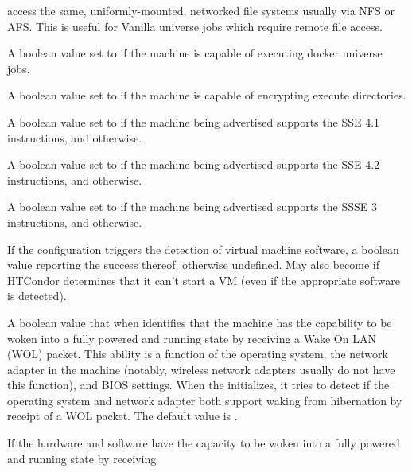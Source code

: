 \begin{description}
access the same, uniformly-mounted, networked file systems usually via
NFS or AFS.  This is useful for Vanilla universe jobs which require
remote file access.
%
\item[\AdAttr{HasDocker}:] A boolean value 
set to  if the machine is capable of executing docker
universe jobs.
%
\item[\AdAttr{HasEncryptExecuteDirectory}:] A boolean value 
set to  if the machine is capable of encrypting execute directories.
%
\item[\AdAttr{Has\_sse4\_1}:] A boolean value set to 
 if the machine being advertised supports
the SSE 4.1 instructions, and  otherwise.
%
\item[\AdAttr{Has\_sse4\_2}:] A boolean value set to 
if the machine being advertised supports
the SSE 4.2 instructions, and  otherwise.
%
\item[\AdAttr{has\_ssse3}:] A boolean value set to 
if the machine being advertised supports
the SSSE 3 instructions, and  otherwise.
%
\item[\AdAttr{HasVM}:] If the configuration triggers the detection of
virtual machine software, a boolean value reporting the success thereof;
otherwise undefined.  May also become  if HTCondor determines
that it can't start a VM (even if the appropriate software is detected).
%
\item[\AdAttr{IsWakeAble}:] A boolean value that when  identifies
that the machine has the capability to be woken into a 
fully powered and running state by receiving a Wake On LAN (WOL) packet.
This ability is a function of the operating system, 
the network adapter in the machine 
(notably, wireless network adapters usually do not have this function),
and BIOS settings. 
When the  initializes, 
it tries to detect if the operating system and network adapter both support 
waking from hibernation by receipt of a WOL packet.
The default value is .
%
\item[\AdAttr{IsWakeEnabled}:] If the hardware and software have the capacity 
to be woken into a fully powered and running state by receiving 

\end{description}
